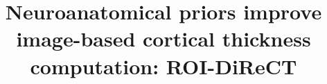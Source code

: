 \documentclass[preprint,authoryear,review,12pt]{elsarticle}
\begin{document}
\begin{frontmatter}

\title{Neuroanatomical priors improve image-based cortical thickness computation: ROI-DiReCT}



%







\end{frontmatter}
\end{document}
